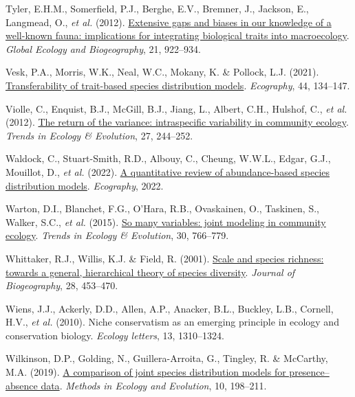 \documentclass[9pt,biorxiv,doublespacing,lineno]{lapreprint}
\newlength{\cslhangindent}
\newlength{\cslentryspacingunit} %
\newenvironment{CSLReferences}[2] %
 {%
  \setlength{\parindent}{0pt}
  \ifodd #1
  \let\oldpar\par
  \def\par{\hangindent=\cslhangindent\oldpar}
  \fi
  \setlength{\parskip}{#2\cslentryspacingunit}
 }%
 {}
\begin{document}
\begin{CSLReferences}{1}{0}
\leavevmode{}%
Tyler, E.H.M., Somerfield, P.J., Berghe, E.V., Bremner, J., Jackson, E.,
Langmead, O., \emph{et al.} (2012).
\href{https://doi.org/10.1111/j.1466-8238.2011.00726.x}{Extensive gaps
and biases in our knowledge of a well-known fauna: implications for
integrating biological traits into macroecology}. \emph{Global Ecology
and Biogeography}, 21, 922--934.

\leavevmode{}%
Vesk, P.A., Morris, W.K., Neal, W.C., Mokany, K. \& Pollock, L.J.
(2021). \href{https://doi.org/10.1111/ecog.05179}{Transferability of
trait-based species distribution models}. \emph{Ecography}, 44,
134--147.

\leavevmode{}%
Violle, C., Enquist, B.J., McGill, B.J., Jiang, L., Albert, C.H.,
Hulshof, C., \emph{et al.} (2012).
\href{https://doi.org/10.1016/j.tree.2011.11.014}{The return of the
variance: intraspecific variability in community ecology}. \emph{Trends
in Ecology \& Evolution}, 27, 244--252.

\leavevmode{}%
Waldock, C., Stuart-Smith, R.D., Albouy, C., Cheung, W.W.L., Edgar,
G.J., Mouillot, D., \emph{et al.} (2022).
\href{https://doi.org/10.1111/ecog.05694}{A quantitative review of
abundance-based species distribution models}. \emph{Ecography}, 2022.

\leavevmode{}%
Warton, D.I., Blanchet, F.G., O'Hara, R.B., Ovaskainen, O., Taskinen,
S., Walker, S.C., \emph{et al.} (2015).
\href{https://doi.org/10.1016/j.tree.2015.09.007}{So many variables:
joint modeling in community ecology}. \emph{Trends in Ecology \&
Evolution}, 30, 766--779.

\leavevmode{}%
Whittaker, R.J., Willis, K.J. \& Field, R. (2001).
\href{https://doi.org/10.1046/j.1365-2699.2001.00563.x}{Scale and
species richness: towards a general, hierarchical theory of species
diversity}. \emph{Journal of Biogeography}, 28, 453--470.

\leavevmode{}%
Wiens, J.J., Ackerly, D.D., Allen, A.P., Anacker, B.L., Buckley, L.B.,
Cornell, H.V., \emph{et al.} (2010). Niche conservatism as an emerging
principle in ecology and conservation biology. \emph{Ecology letters},
13, 1310--1324.

\leavevmode{}%
Wilkinson, D.P., Golding, N., Guillera-Arroita, G., Tingley, R. \&
McCarthy, M.A. (2019). \href{https://doi.org/10.1111/2041-210X.13106}{A
comparison of joint species distribution models for presence--absence
data}. \emph{Methods in Ecology and Evolution}, 10, 198--211.


\end{CSLReferences}
\end{document}
